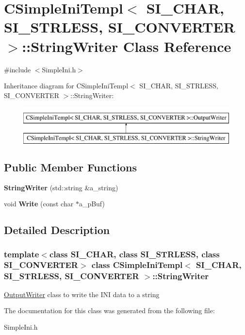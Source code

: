 \hypertarget{a00896}{}\section{C\+Simple\+Ini\+Templ$<$ S\+I\+\_\+\+C\+H\+AR, S\+I\+\_\+\+S\+T\+R\+L\+E\+SS, S\+I\+\_\+\+C\+O\+N\+V\+E\+R\+T\+ER $>$\+:\+:String\+Writer Class Reference}
\label{a00896}


{\ttfamily \#include $<$Simple\+Ini.\+h$>$}

Inheritance diagram for C\+Simple\+Ini\+Templ$<$ S\+I\+\_\+\+C\+H\+AR, S\+I\+\_\+\+S\+T\+R\+L\+E\+SS, S\+I\+\_\+\+C\+O\+N\+V\+E\+R\+T\+ER $>$\+:\+:String\+Writer\+:\begin{figure}[H]
\begin{center}
\leavevmode
\includegraphics[height=2.000000cm]{a00896}
\end{center}
\end{figure}
\subsection*{Public Member Functions}
\begin{DoxyCompactItemize}
\item 
\mbox{\label{a00896_ad50338a07a9b6de7e4a78d0bbc11f67b}} 
{\bfseries String\+Writer} (std\+::string \&a\+\_\+string)
\item 
\mbox{\label{a00896_afdfd0dfe71278ea7490a9d4ef6bffadc}} 
void {\bfseries Write} (const char $\ast$a\+\_\+p\+Buf)
\end{DoxyCompactItemize}


\subsection{Detailed Description}
\subsubsection*{template$<$class S\+I\+\_\+\+C\+H\+AR, class S\+I\+\_\+\+S\+T\+R\+L\+E\+SS, class S\+I\+\_\+\+C\+O\+N\+V\+E\+R\+T\+ER$>$\newline
class C\+Simple\+Ini\+Templ$<$ S\+I\+\_\+\+C\+H\+A\+R, S\+I\+\_\+\+S\+T\+R\+L\+E\+S\+S, S\+I\+\_\+\+C\+O\+N\+V\+E\+R\+T\+E\+R $>$\+::\+String\+Writer}

\hyperlink{a00888}{Output\+Writer} class to write the I\+NI data to a string 

The documentation for this class was generated from the following file\+:\begin{DoxyCompactItemize}
\item 
Simple\+Ini.\+h\end{DoxyCompactItemize}
